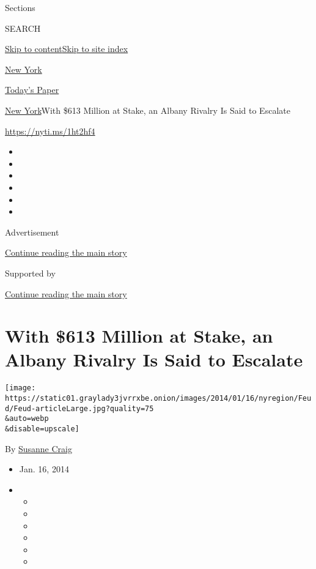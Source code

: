 Sections

SEARCH

\protect\hyperlink{site-content}{Skip to
content}\protect\hyperlink{site-index}{Skip to site index}

\href{https://www.nytimes3xbfgragh.onion/section/nyregion}{New York}

\href{https://myaccount.nytimes3xbfgragh.onion/auth/login?response_type=cookie\&client_id=vi}{}

\href{https://www.nytimes3xbfgragh.onion/section/todayspaper}{Today's
Paper}

\href{/section/nyregion}{New York}\textbar{}With \$613 Million at Stake,
an Albany Rivalry Is Said to Escalate

\url{https://nyti.ms/1ht2hf4}

\begin{itemize}
\item
\item
\item
\item
\item
\item
\end{itemize}

Advertisement

\protect\hyperlink{after-top}{Continue reading the main story}

Supported by

\protect\hyperlink{after-sponsor}{Continue reading the main story}

\hypertarget{with-613-million-at-stake-an-albany-rivalry-is-said-to-escalate}{%
\section{With \$613 Million at Stake, an Albany Rivalry Is Said to
Escalate}\label{with-613-million-at-stake-an-albany-rivalry-is-said-to-escalate}}

\texttt{[image: https://static01.graylady3jvrrxbe.onion/images/2014/01/16/nyregion/Feud/Feud-articleLarge.jpg?quality=75\\\&auto=webp\\\&disable=upscale]}

By \href{http://www.nytimes3xbfgragh.onion/by/susanne-craig}{Susanne
Craig}

\begin{itemize}
\item
  Jan. 16, 2014
\item
  \begin{itemize}
  \item
  \item
  \item
  \item
  \item
  \item
  \end{itemize}
\end{itemize}


